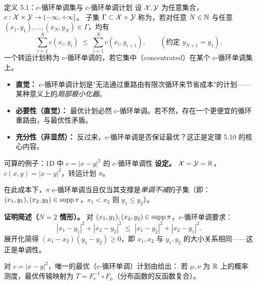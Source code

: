 \begin{frame}{定义 5.1：c-循环单调集与 c-循环单调计划}
  设 $\mathcal{X},\mathcal{Y}$ 为任意集合，$c:\mathcal{X}\times\mathcal{Y}\to(-\infty,+\infty]$。
  子集 $\Gamma\subset\mathcal{X}\times\mathcal{Y}$ 称为，若对任意 $N\in\mathbb{N}$
  与任意 $(x_1,y_1),\ldots,(x_N,y_N)\in\Gamma$，均有
  \[
    \sum_{i=1}^{N} c(x_i,y_i) \;\le\; \sum_{i=1}^{N} c(x_i,y_{i+1}),
    \qquad (\text{约定 }y_{N+1}=y_1).
  \]
  一个转运计划称为 c-循环单调的，若它集中（concentrated）在某个 c-循环单调集上。

  \begin{itemize}\small
    \item \textbf{直觉：} c-循环单调计划是"无法通过重路由有限次循环来节省成本"的计划——某种意义上的\emph{局部极小化器}。
    \item \textbf{必要性（直觉）：} 最优计划必然 c-循环单调。若不然，存在一个更便宜的循环重路由，与最优性矛盾。
    \item \textbf{充分性（非显然）：} 反过来，c-循环单调是否保证最优？这正是定理 5.10 的核心内容。
  \end{itemize}

\end{frame}

\begin{frame}{可算的例子：1D 中 $c=|x-y|^2$ 的 c-循环单调性}
  \textbf{设定。} $\mathcal{X}=\mathcal{Y}=\mathbb{R}$，$c(x,y)=|x-y|^2$，转运计划 $\pi$。

  \medskip
   在此成本下，$\pi$ c-循环单调当且仅当其支撑是\emph{单调不减}的子集（即：$(x_1,y_1),(x_2,y_2)\in\operatorname{supp}\pi$，$x_1<x_2$ 则 $y_1\le y_2$）。

  \medskip
  \textbf{证明简述（$N=2$ 情形）。} 对 $(x_1,y_1),(x_2,y_2)\in\operatorname{supp}\pi$，c-循环单调要求：
  \[
    |x_1-y_1|^2+|x_2-y_2|^2 \;\le\; |x_1-y_2|^2+|x_2-y_1|^2.
  \]
  展开化简得 $(x_1-x_2)(y_1-y_2)\ge0$，即 $x_1,x_2$ 与 $y_1,y_2$ 的大小关系相同——这正是单调性。

  \medskip
   对 $c=|x-y|^2$，唯一的最优（c-循环单调）计划由给出：
  若 $\mu,\nu$ 为 $\mathbb{R}$ 上的概率测度，最优传输映射为 $T=F_{\nu}^{-1}\circ F_{\mu}$（分布函数的反函数复合）。

\end{frame}

